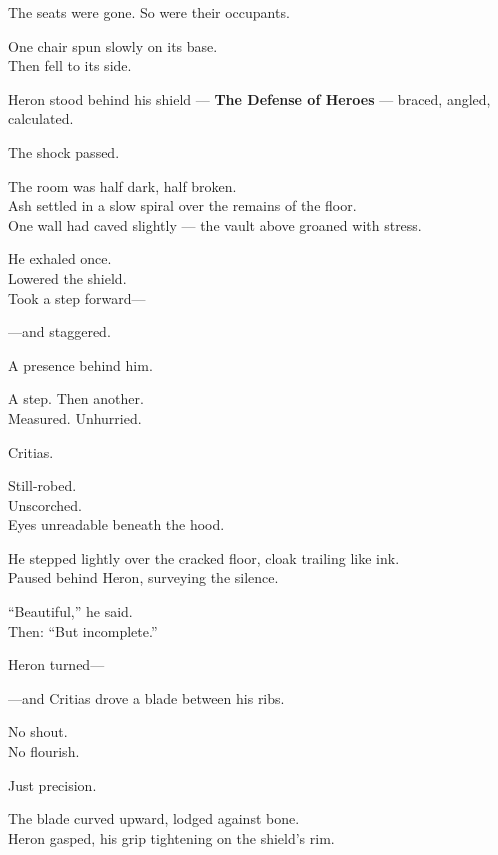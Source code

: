 \documentclass[9pt]{article}
\begin{document}
The seats were gone.  
So were their occupants.

One chair spun slowly on its base.\\
Then fell to its side.

\vspace{1em}

Heron stood behind his shield — \textbf{The Defense of Heroes} — braced, angled, calculated.

The shock passed.

The room was half dark, half broken.\\
Ash settled in a slow spiral over the remains of the floor.\\
One wall had caved slightly — the vault above groaned with stress.

He exhaled once.\\
Lowered the shield.\\
Took a step forward—

—and staggered.

\vspace{1em}

A presence behind him.

A step. Then another.\\
Measured. Unhurried.

\vspace{1em}

Critias.

Still-robed.\\
Unscorched.\\
Eyes unreadable beneath the hood.

He stepped lightly over the cracked floor, cloak trailing like ink.\\
Paused behind Heron, surveying the silence.

\vspace{1em}

“Beautiful,” he said.\\
Then: “But incomplete.”

Heron turned—

—and Critias drove a blade between his ribs.

\vspace{1em}

No shout.\\
No flourish.

Just precision.

The blade curved upward, lodged against bone.\\
Heron gasped, his grip tightening on the shield’s rim.
\end{document}
